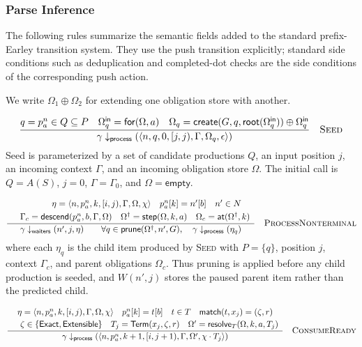 \subsubsection{Parse Inference}

The following rules summarize the semantic fields added to the standard prefix-Earley transition system. They use the push transition explicitly; standard side conditions such as deduplication and completed-dot checks are the side conditions of the corresponding push action.

We write $\Omega_1\oplus\Omega_2$ for extending one obligation store with another.

\[
\frac{
  q=p^n_a \in Q \subseteq P
  \quad
  \Omega^{\mathsf{in}}_q=\mathsf{for}(\Omega,a)
  \quad
  \Omega_q=
  \mathsf{create}(G,q,\mathsf{root}(\Omega^{\mathsf{in}}_q))
  \oplus
  \Omega^{\mathsf{in}}_q
}{
\gamma \downarrow_{\mathsf{process}}
  (\langle n,q,0,[j,j),\Gamma,\Omega_q,\epsilon\rangle)
}
\quad\textsc{Seed}
\]
Seed is parameterized by a set of candidate productions \(Q\), an input
position \(j\), an incoming context \(\Gamma\), and an incoming obligation store
\(\Omega\). The initial call is $Q=A(S)$, $j=0$, $\Gamma=\Gamma_0$, and $\Omega=\mathsf{empty}$.

\[
\frac{
  \begin{array}{cr}
  &\eta=\langle n,p^n_a,k,[i,j),\Gamma,\Omega,\chi\rangle
  \quad
  p^n_a[k]=n'[b]
  \quad
  n'\in N
  \quad \\[0.30em]
  &\Gamma_c=\mathsf{descend}(p^n_a,b,\Gamma,\Omega)
  \quad
  \Omega^\dagger=\mathsf{step}(\Omega,k,a)
  \quad
  \Omega_c=\mathsf{at}(\Omega^\dagger,k)
  \end{array}
}{
\gamma \downarrow_{\mathsf{waiters}}(n',j,\eta)
\qquad
\forall q \in \mathsf{prune}(\Omega^\dagger,n',G),\quad
\gamma \downarrow_{\mathsf{process}}(\eta_q)
}
\quad\textsc{ProcessNonterminal}
\]
where each $\eta_q$ is the child item produced by \textsc{Seed} with $P=\{q\}$, position $j$, context $\Gamma_c$, and parent obligations $\Omega_c$. Thus pruning is applied before any child production is seeded, and $W(n',j)$ stores the paused parent item rather than the predicted child.

\[
\frac{
\begin{array}{c}

  \eta=\langle n,p^n_a,k,[i,j),\Gamma,\Omega,\chi\rangle
  \quad
  p^n_a[k]=t[b]
  \quad
  t\in T 
  \quad
  \mathsf{match}(t,x_j)=(\zeta,r) \\[0.25em]
  \quad
  \zeta\in\{\mathsf{Exact},\mathsf{Extensible}\} 
  \quad
  T_j=\mathsf{Term}(x_j,\zeta,r)
  \quad
  \Omega'=\mathsf{resolve}_T(\Omega,k,a,T_j)
\end{array}
}{
  \gamma \downarrow_{\mathsf{process}}
  (\langle n,p^n_a,k+1,[i,j+1),\Gamma,\Omega',\chi\cdot T_j\rangle)
}
\quad\textsc{ConsumeReady}
\]

